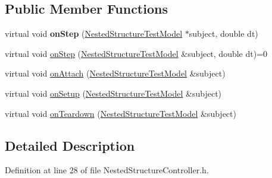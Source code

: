 \subsection*{Public Member Functions}
\begin{DoxyCompactItemize}
\item 
\hypertarget{class_nested_structure_controller_a44adc42c16fbeadbfa169dd71b796daa}{virtual void {\bfseries on\-Step} (\hyperlink{class_nested_structure_test_model}{Nested\-Structure\-Test\-Model} $\ast$subject, double dt)}\label{class_nested_structure_controller_a44adc42c16fbeadbfa169dd71b796daa}

\item 
virtual void \hyperlink{classtg_observer_a6db5ef1e2792102b8e36dbad5e1a3d7a}{on\-Step} (\hyperlink{class_nested_structure_test_model}{Nested\-Structure\-Test\-Model} \&subject, double dt)=0
\item 
virtual void \hyperlink{classtg_observer_a0ecd07483eb41f9a0ab19b8ed24052f1}{on\-Attach} (\hyperlink{class_nested_structure_test_model}{Nested\-Structure\-Test\-Model} \&subject)
\item 
virtual void \hyperlink{classtg_observer_ae7b2de87bd4a6e786bc16f1b801c36a6}{on\-Setup} (\hyperlink{class_nested_structure_test_model}{Nested\-Structure\-Test\-Model} \&subject)
\item 
virtual void \hyperlink{classtg_observer_a1663edb3732e5ffb7bbe6bfb4ade88b8}{on\-Teardown} (\hyperlink{class_nested_structure_test_model}{Nested\-Structure\-Test\-Model} \&subject)
\end{DoxyCompactItemize}


\subsection{Detailed Description}


Definition at line 28 of file Nested\-Structure\-Controller.\-h.



